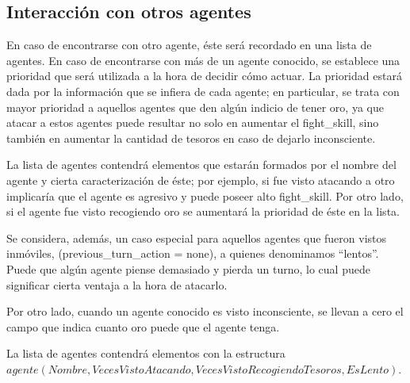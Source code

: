 \documentclass[a4paper,10pt,spanish]{article}
\begin{document}
	\subsection{Interacci\'on con otros agentes}
	
	En caso de encontrarse con otro agente, \'este ser\'a recordado en una lista de agentes. En caso de encontrarse con m\'as de un agente conocido, se establece una prioridad que ser\'a utilizada a la hora de decidir c\'omo actuar. La prioridad estar\'a dada por la informaci\'on que se infiera de cada agente; en particular, se trata con mayor prioridad a aquellos agentes que den alg\'un indicio de tener oro, ya que atacar a estos agentes puede resultar no solo en aumentar el fight\_skill, sino tambi\'en en aumentar la cantidad de tesoros en caso de dejarlo inconsciente.
	
	La lista de agentes contendr\'a elementos que estar\'an formados por el nombre del agente y cierta caracterizaci\'on de \'este; por ejemplo, si fue visto atacando a otro implicar\'ia que el agente es agresivo y puede poseer alto fight\_skill. Por otro lado, si el agente fue visto recogiendo oro se aumentar\'a la prioridad de \'este en la lista. 
	
	Se considera, adem\'as, un caso especial para aquellos agentes que fueron vistos inm\'oviles, (previous\_turn\_action = none), a quienes denominamos ``lentos''. Puede que alg\'un agente piense demasiado y pierda un turno, lo cual puede significar cierta ventaja a la hora de atacarlo.
	
	Por otro lado, cuando un agente conocido es visto inconsciente, se llevan a cero el campo que indica cuanto oro puede que el agente tenga.
	
	La lista de agentes contendr\'a elementos con la estructura \\
	$agente(Nombre, VecesVistoAtacando, VecesVistoRecogiendoTesoros, EsLento)$.
	
% 	
	
\end{document}
